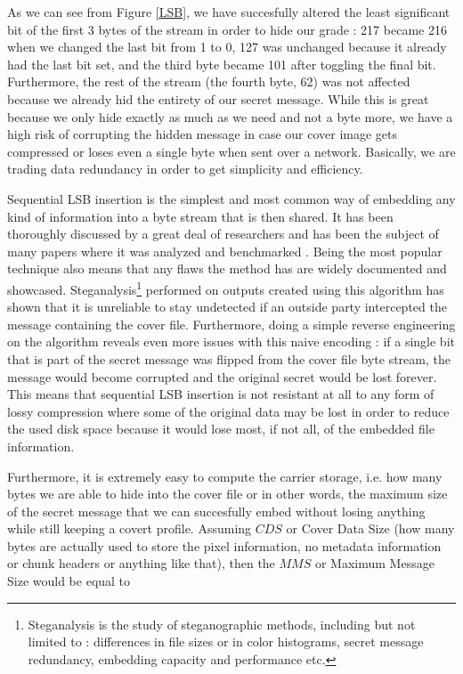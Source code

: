 \begin{multicols*}{2}
As we can see from Figure \ref{LSB}, we have succesfully altered the least significant bit of the first 3 bytes of the stream in order to hide our grade : 217 became 216 when we changed the last bit from 1 to 0, 127 was unchanged because it already had the last bit set, and the third byte became 101 after toggling the final bit. Furthermore, the rest of the stream (the fourth byte, 62) was not affected because we already hid the entirety of our secret message. While this is great because we only hide exactly as much as we need and not a byte more, we have a high risk of corrupting the hidden message in case our cover image gets compressed or loses even a single byte when sent over a network. Basically, we are trading data redundancy in order to get simplicity and efficiency.

Sequential LSB insertion is the simplest and most common way of embedding any kind of information into a byte stream that is then shared. It has been thoroughly discussed by a great deal of researchers and has been the subject of many papers where it was analyzed and benchmarked\cite{seeing-the-unseen}\cite{hide-and-seek} . Being the most popular technique also means that any flaws the method has are widely documented and showcased. Steganalysis\footnote{Steganalysis is the study of steganographic methods, including but not limited to : differences in file sizes or in color histograms, secret message redundancy, embedding capacity and performance etc.} performed on outputs created using this algorithm has shown that it is unreliable to stay undetected if an outside party intercepted the message containing the cover file\cite{attack-on-steganography}. Furthermore, doing a simple reverse engineering on the algorithm reveals even more issues with this naive encoding : if a single bit that is part of the secret message was flipped from the cover file byte stream, the message would become corrupted and the original secret would be lost forever. This means that sequential LSB insertion is not resistant at all to any form of lossy compression where some of the original data may be lost in order to reduce the used disk space because it would lose most, if not all, of the embedded file information. 

Furthermore, it is extremely easy to compute the carrier storage, i.e. how many bytes we are able to hide into the cover file or in other words, the maximum size of the secret message that we can succesfully embed without losing anything while still keeping a covert profile. Assuming $CDS$ or Cover Data Size (how many bytes are actually used to store the pixel information, no metadata information or chunk headers or anything like that), then the $MMS$ or Maximum Message Size would be equal to


\end{multicols*}
